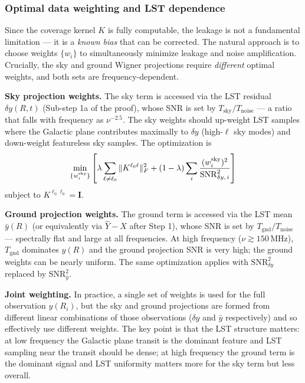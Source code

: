 \documentclass{aastex631}
\theoremstyle{plain}
\theoremstyle{remark}
\begin{document}
\subsubsection{Optimal data weighting and LST dependence}
\label{sec:weighting}

Since the coverage kernel $K$ is fully computable, the leakage
is not a fundamental limitation --- it is a \emph{known bias} that
can be corrected.
The natural approach is to choose weights $\{w_i\}$ to simultaneously
minimize leakage and noise amplification.
Crucially, the sky and ground Wigner projections require
\emph{different} optimal weights, and both sets are
frequency-dependent.

\textbf{Sky projection weights.}
The sky term is accessed via the LST residual $\delta y(R,t)$
(Sub-step 1a of the proof), whose SNR is set by
$T_\mathrm{sky}/T_\mathrm{noise}$ — a ratio that falls with
frequency as $\nu^{-2.5}$.
The sky weights should up-weight LST samples where the Galactic
plane contributes maximally to $\delta y$ (high-$\ell$ sky modes)
and down-weight featureless sky samples.
The optimization is
\begin{equation} \label{eq:optweights_sky}
  \min_{\{w^{\rm sky}_i\}} \left[
    \lambda \sum_{\ell \neq \ell_0} \|K^{\ell_0\ell}\|_F^2
    + (1-\lambda) \sum_i \frac{(w^{\rm sky}_i)^2}{\mathrm{SNR}^2_{\delta y,\,i}}
  \right]
\end{equation}
subject to $K^{\ell_0\ell_0} = \mathbf{I}$.

\textbf{Ground projection weights.}
The ground term is accessed via the LST mean $\bar{y}(R)$
(or equivalently via $\hat{Y} - X$ after Step 1), whose SNR
is set by $T_\mathrm{gnd}/T_\mathrm{noise}$ — spectrally flat and
large at all frequencies.
At high frequency ($\nu \gtrsim 150$\,MHz), $T_\mathrm{gnd}$ dominates
$y(R)$ and the ground projection SNR is very high; the ground weights
can be nearly uniform.
The same optimization applies with $\mathrm{SNR}^2_{\delta y}$
replaced by $\mathrm{SNR}^2_{\bar{y}}$.

\textbf{Joint weighting.}
In practice, a single set of weights is used for the full observation
$y(R_i)$, but the sky and ground projections are formed from
different linear combinations of those observations ($\delta y$ and
$\bar{y}$ respectively) and so effectively use different weights.
The key point is that the LST structure matters:
at low frequency the Galactic plane transit is the dominant
feature and LST sampling near the transit should be dense;
at high frequency the ground term is the dominant signal and
LST uniformity matters more for the sky term but less overall.
\end{document}
